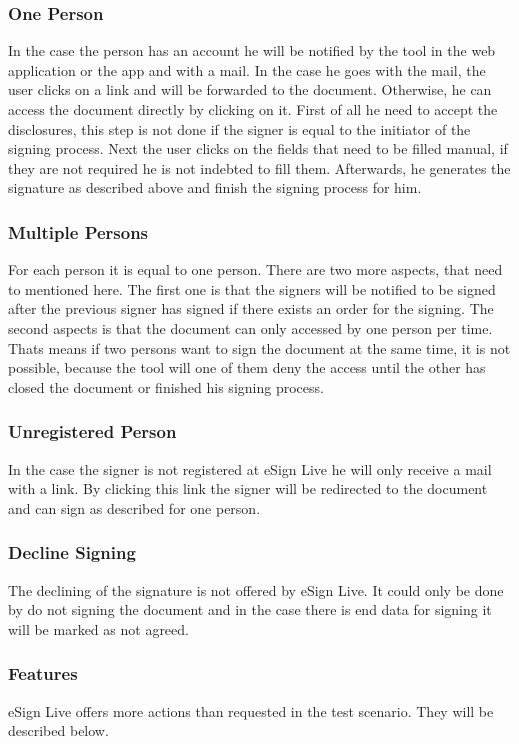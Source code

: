 \subsubsection{One Person}
In the case the person has an account he will be notified by the tool in the web application or the \gls{app} and with a mail. In the case he goes with the mail, the user clicks on a link and will be forwarded to the document. Otherwise, he can access the document directly by clicking on it. First of all he need to accept the disclosures, this step is not done if the signer is equal to the initiator of the signing process. Next the user clicks on the fields that need to be filled manual, if they are not required he is not indebted to fill them. Afterwards, he generates the signature as described above and finish the signing process for him.

\subsubsection{Multiple Persons}
For each person it is equal to one person. There are two more aspects, that need to mentioned here. The first one is that the signers will be notified to be signed after the previous signer has signed if there exists an order for the signing. The second aspects is that the document can only accessed by one person per time. Thats means if two persons want to sign the document at the same time, it is not possible, because the tool will one of them deny the access until the other has closed the document or finished his signing process.

\subsubsection{Unregistered Person}
In the case the signer is not registered at eSign Live he will only receive a mail with a link. By clicking this link the signer will be redirected to the document and can sign as described for one person.

\subsubsection{Decline Signing}
The declining of the signature is not offered by eSign Live. It could only be done by do not signing the document and in the case there is end data for signing it will be marked as not agreed.

\subsubsection{Features}
eSign Live offers more actions than requested in the test scenario. They will be described below.


